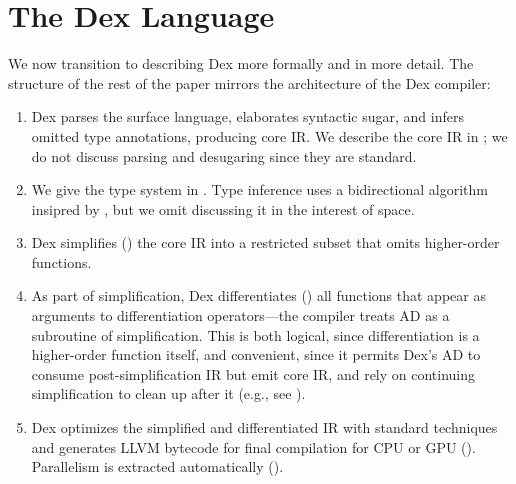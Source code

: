 \documentclass[acmsmall,screen,nonacm]{acmart}
\begin{document}
\section{The Dex Language}
\label{sec:formal-language}

We now transition to describing Dex more formally and in more detail.
The structure of the rest of the paper mirrors the architecture of the Dex compiler:
\begin{enumerate}
\item Dex parses the surface language, elaborates syntactic sugar, and infers omitted type annotations, producing core IR.
We describe the core IR in ; we do not discuss parsing and desugaring since they are standard.
\item We give the type system in .
Type inference uses a bidirectional algorithm insipred by \citet{peytonjones2007practical}, but we omit discussing it in the interest of space.
\item Dex simplifies () the core IR into a restricted subset that omits higher-order functions.
\item As part of simplification, Dex differentiates () all functions that appear as arguments to differentiation operators---the compiler treats AD as a subroutine of simplification.
This is both logical, since differentiation is a higher-order function itself, and convenient, since it permits Dex's AD to consume post-simplification IR but emit core IR, and rely on continuing simplification to clean up after it (e.g., see ).
\item Dex optimizes the simplified and differentiated IR with standard techniques and generates LLVM bytecode for final compilation for CPU or GPU ().
Parallelism is extracted automatically ().
\end{enumerate}
\end{document}
